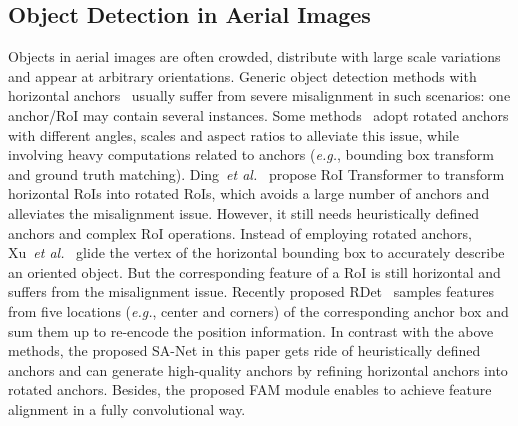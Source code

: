 \documentclass[10pt,journal,final]{IEEEtran}
\def\eg{{\em e.g.}}
\def\etal{\emph{et al.}}
\begin{document}
\vspace*{-3mm}
\subsection{Object Detection in Aerial Images} 
Objects in aerial images are often crowded, distribute with large scale variations and appear at arbitrary orientations. Generic object detection methods with horizontal anchors~\cite{xia2018dota} usually suffer from severe misalignment in such scenarios: one anchor/RoI may contain several instances. Some methods~\cite{liu2016ship,liu2017rotated,ma2018arbitrary} adopt rotated anchors with different angles, scales and aspect ratios to alleviate this issue, while involving heavy computations related to anchors (\eg, bounding box transform and ground truth matching). Ding~\etal~\cite{ding2018transformer} propose RoI Transformer to transform horizontal RoIs into rotated RoIs, which avoids a large number of anchors and alleviates the misalignment issue. However, it still needs heuristically defined anchors and complex RoI operations. Instead of employing rotated anchors, Xu~\etal~\cite{xu2019gliding} glide the vertex of the horizontal bounding box to accurately describe an oriented object. But the corresponding feature of a RoI is still horizontal and suffers from the misalignment issue. Recently proposed RDet~\cite{yang2019r3det} samples features from five locations (\eg, center and corners) of the corresponding anchor box and sum them up to re-encode the position information. In contrast with the above methods, the proposed SA-Net in this paper gets ride of heuristically defined anchors and can generate high-quality anchors by refining horizontal anchors into rotated anchors. Besides, the proposed FAM module enables to achieve feature alignment in a fully convolutional way.  

\vspace*{-3mm}
\end{document}
